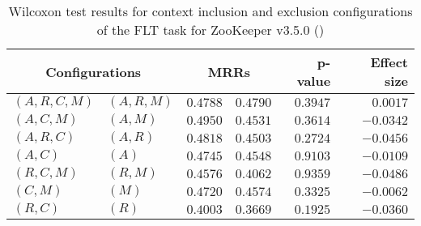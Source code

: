 
\begin{table}
\begin{spacing}{1.2}
\centering
\caption{Wilcoxon test results for context inclusion and exclusion configurations of the FLT task for ZooKeeper v3.5.0 (\ctwo)}
\label{table:versus-wilcox-zookeeper-flt-context}
\begin{tabular}{ll|rr|rr}
\toprule
      \multicolumn{2}{c|}{Configurations} &                \multicolumn{2}{c|}{MRRs} &             p-value & Effect size \\
\midrule
 $(A,R,C,M)$ &  $(A,R,M)$ &       $0.4788$ &  $\bm{0.4790}$ & $0.3947$ &    $0.0017$ \\
   $(A,C,M)$ &    $(A,M)$ &  $\bm{0.4950}$ &       $0.4531$ & $0.3614$ &   $-0.0342$ \\
   $(A,R,C)$ &    $(A,R)$ &  $\bm{0.4818}$ &       $0.4503$ & $0.2724$ &   $-0.0456$ \\
     $(A,C)$ &      $(A)$ &  $\bm{0.4745}$ &       $0.4548$ & $0.9103$ &   $-0.0109$ \\
   $(R,C,M)$ &    $(R,M)$ &  $\bm{0.4576}$ &       $0.4062$ & $0.9359$ &   $-0.0486$ \\
     $(C,M)$ &      $(M)$ &  $\bm{0.4720}$ &       $0.4574$ & $0.3325$ &   $-0.0062$ \\
     $(R,C)$ &      $(R)$ &  $\bm{0.4003}$ &       $0.3669$ & $0.1925$ &   $-0.0360$ \\
\bottomrule
\end{tabular}

\end{spacing}
\end{table}

